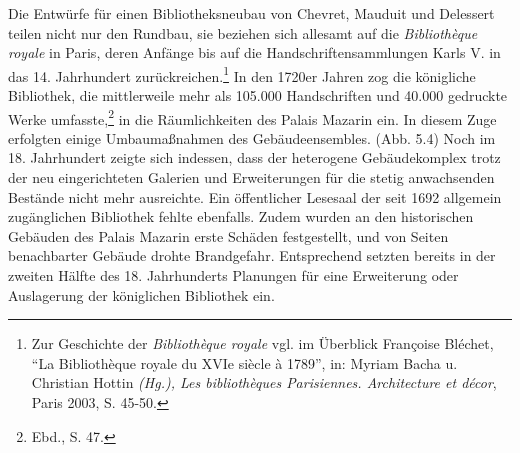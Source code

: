 Die Entwürfe für einen Bibliotheksneubau von Chevret, Mauduit und
Delessert teilen nicht nur den Rundbau, sie beziehen sich allesamt auf
die \emph{Bibliothèque royale} in Paris, deren Anfänge bis auf die
Handschriftensammlungen Karls V. in das 14. Jahrhundert
zurückreichen.\footnote{Zur Geschichte der \emph{Bibliothèque royale}
  vgl. im Überblick Françoise Bléchet, \enquote{La Bibliothèque royale
  du XVIe siècle à 1789}, in: Myriam Bacha u. Christian Hottin
  \emph{(Hg.), Les bibliothèques Parisiennes. Architecture et décor},
  Paris 2003, S. 45-50.} In den 1720er Jahren zog die königliche
Bibliothek, die mittlerweile mehr als 105.000 Handschriften und 40.000
gedruckte Werke umfasste,\footnote{Ebd., S. 47.} in die Räumlichkeiten
des Palais Mazarin ein. In diesem Zuge erfolgten einige Umbaumaßnahmen
des Gebäudeensembles. (Abb. 5.4) Noch im 18. Jahrhundert zeigte sich
indessen, dass der heterogene Gebäudekomplex trotz der neu
eingerichteten Galerien und Erweiterungen für die stetig anwachsenden
Bestände nicht mehr ausreichte. Ein öffentlicher Lesesaal der seit 1692
allgemein zugänglichen Bibliothek fehlte ebenfalls. Zudem wurden an den
historischen Gebäuden des Palais Mazarin erste Schäden festgestellt, und
von Seiten benachbarter Gebäude drohte Brandgefahr. Entsprechend setzten
bereits in der zweiten Hälfte des 18. Jahrhunderts Planungen für eine
Erweiterung oder Auslagerung der königlichen Bibliothek ein.

